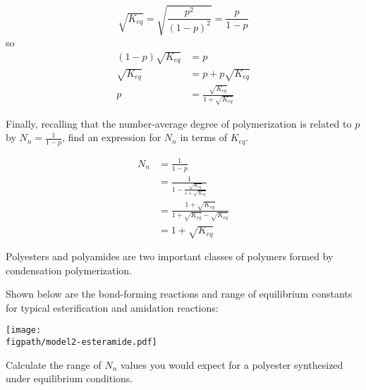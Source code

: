 \begin{activity}
\begin{ctqs}
		\begin{solution}[3.5in]
			\begin{equation*}
				\sqrt{K_{eq}} = \sqrt{\frac{p^2}{(1-p)^2}} = \frac{p}{1-p}
			\end{equation*}
			so
			\begin{align*}
				(1-p)\sqrt{K_{eq}} &= p\\
				\sqrt{K_{eq}} &= p + p\sqrt{K_{eq}}  \\
				p &= \frac{\sqrt{K_{eq}}}{1+\sqrt{K_{eq}}}
			\end{align*}
		\end{solution}
	
	
	\question Finally, recalling that the number-average degree of polymerization is related to $p$ by $N_n = \frac{1}{1-p}$, find an expression for $N_n$ in terms of $K_{eq}$.
		
		\begin{solution}[4.5in]
			\begin{align*}
				N_n &= \frac{1}{1-p} \\
				&= \frac{1}{1-\frac{\sqrt{K_{eq}}}{1+\sqrt{K_{eq}}}}\\
				&= \frac{1+\sqrt{K_{eq}}}{1+\sqrt{K_{eq}} - \sqrt{K_{eq}}}\\
				&= 1+ \sqrt{K_{eq}}
			\end{align*}
		\end{solution}
		
\end{ctqs}
	
\clearpage %
\begin{model}
\label{\labelbase:mdl:K}

Polyesters and polyamides are two important classes of polymers formed by condensation polymerization.

Shown below are the bond-forming reactions and range of equilibrium constants for typical esterification and amidation reactions:
	
		\vspace{0.1in}
		\centerline{\texttt{[image: \\figpath/model2-esteramide.pdf]}}

\end{model}

\begin{ctqs}
		\question Calculate the range of $N_n$ values you would expect for a polyester synthesized under equilibrium conditions.
		

\end{ctqs}
\end{activity}
